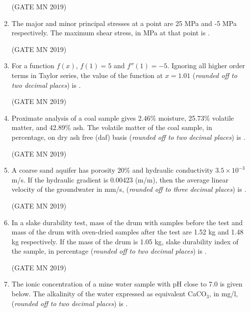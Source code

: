 \documentclass[journal]{IEEEtran}
\begin{document}
\begin{enumerate}
	  \hfill(GATE MN 2019)

  \item The major and minor principal stresses at a point are 25 MPa and -5 MPa respectively. The maximum shear stress, in MPa at that point is \underline{\hspace{2cm}}.

	  \hfill(GATE MN 2019)

  \item For a function $f(x)$, $f(1)=5$ and $f''(1)=-5$. Ignoring all higher order terms in Taylor series, the value of the function at $x=1.01$ (\textit{rounded off to two decimal places}) is \underline{\hspace{2cm}}.

	  \hfill(GATE MN 2019)

  \item Proximate analysis of a coal sample gives 2.46\% moisture, 25.73\% volatile matter, and 42.89\% ash. The volatile matter of the coal sample, in percentage, on dry ash free (daf) basis (\textit{rounded off to two decimal places}) is \underline{\hspace{2cm}}.

	  \hfill(GATE MN 2019)

  \item A coarse sand aquifer has porosity 20\% and hydraulic conductivity $3.5 \times 10^{-3}$ m/s. If the hydraulic gradient is 0.00423 (m/m), then the average linear velocity of the groundwater in mm/s, (\textit{rounded off to three decimal places}) is \underline{\hspace{2cm}}.

	  \hfill(GATE MN 2019)

  \item In a slake durability test, mass of the drum with samples before the test and mass of the drum with oven-dried samples after the test are 1.52 kg and 1.48 kg respectively. If the mass of the drum is 1.05 kg, slake durability index of the sample, in percentage (\textit{rounded off to two decimal places}) is \underline{\hspace{2cm}}.

	  \hfill(GATE MN 2019)

  \item The ionic concentration of a mine water sample with pH close to 7.0 is given below. The alkalinity of the water expressed as equivalent CaCO$_3$, in mg/l, (\textit{rounded off to two decimal places}) is \underline{\hspace{2cm}}.
  

\end{enumerate}
\end{document}
